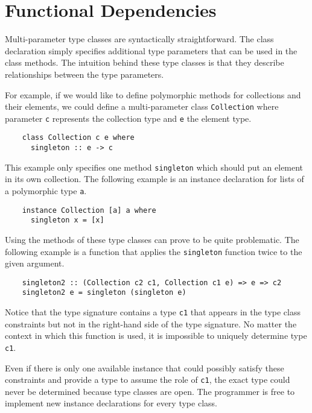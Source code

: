 \section{Functional Dependencies}
\label{sec:functional-dependencies}
Multi-parameter type classes are syntactically straightforward. The class
declaration simply specifies additional type parameters that can be used
in the class methods. The intuition behind these type classes is that they
describe relationships between the type parameters.

For example, if we would like to define polymorphic methods for collections and their
elements, we could define a multi-parameter class \texttt{Collection} where
parameter \texttt{c} represents the collection type and \texttt{e} the
element type.
\begin{verbatim}
    class Collection c e where
      singleton :: e -> c
\end{verbatim}
This example only specifies one method \texttt{singleton} which
should put an element in its own collection.
The following example is an instance declaration for lists of a polymorphic type
\texttt{a}.
\begin{verbatim}
    instance Collection [a] a where
      singleton x = [x]
\end{verbatim}
%
Using the methods of these type classes can prove to be quite problematic. The
following example is a function that applies the \texttt{singleton} function
twice to the given argument.

\begin{verbatim}
    singleton2 :: (Collection c2 c1, Collection c1 e) => e => c2
    singleton2 e = singleton (singleton e)
\end{verbatim}
%
Notice that the type signature contains a type
\texttt{c1} that appears in the type class constraints but not in the right-hand
side of the type signature. No matter the context in which this function is
used, it is impossible to uniquely determine type \texttt{c1}.

Even if there is only one available instance that could possibly satisfy these
constraints and provide a type to assume the role of \texttt{c1}, the exact
type could never be determined because type classes are open. The programmer
is free to implement new instance declarations for every type class.


